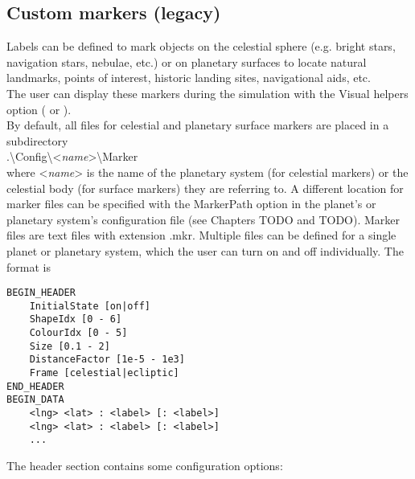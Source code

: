 \documentclass[Orbiter Developer Manual.tex]{subfiles}
\begin{document}
\subsection{Custom markers (legacy)}

\noindent
Labels can be defined to mark objects on the celestial sphere (e.g. bright stars, navigation stars, nebulae, etc.) or on planetary surfaces to locate natural landmarks, points of interest, historic landing sites, navigational aids, etc.\\
The user can display these markers during the simulation with the Visual helpers option ( or \Ctrl{}).\\
By default, all files for celestial and planetary surface markers are placed in a subdirectory\\
.\textbackslash Config\textbackslash <\textit{name}>\textbackslash Marker\\
where <\textit{name}> is the name of the planetary system (for celestial markers) or the celestial body (for surface markers) they are referring to. A different location for marker files can be specified with the MarkerPath option in the planet’s or planetary system’s configuration file (see Chapters TODO and TODO). Marker files are text files with extension .mkr. Multiple files can be defined for a single planet or planetary system, which the user can turn on and off individually. The format is

\begin{lstlisting}[language=OSFS]
BEGIN_HEADER
	InitialState [on|off]
	ShapeIdx [0 - 6]
	ColourIdx [0 - 5]
	Size [0.1 - 2]
	DistanceFactor [1e-5 - 1e3]
	Frame [celestial|ecliptic]
END_HEADER
BEGIN_DATA
	<lng> <lat> : <label> [: <label>]
	<lng> <lat> : <label> [: <label>]
	...
\end{lstlisting}

\noindent
The header section contains some configuration options:
\end{document}
